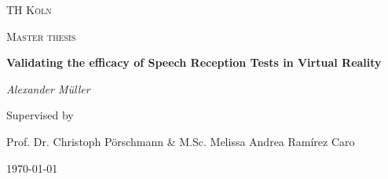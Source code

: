 \documentclass[a4paper,11pt]{article}%
\renewcommand{\\}{\vspace*{0.5\baselineskip} \newline}
\begin{document}
	

\begin{titlepage}
	\centering
	{\scshape\LARGE TH Köln \par}
	\vspace{1cm}
	{\scshape\Large Master thesis\par}
	\vspace{1.5cm}
	{\huge\bfseries Validating the efficacy of Speech Reception Tests in Virtual Reality\par}
	\vspace{2cm}
	{\Large\itshape Alexander Müller \par}
	\vfill
	Supervised by\par
    \par Prof. Dr. Christoph Pörschmann 	\&  M.Sc. Melissa Andrea Ramírez Caro \par
	\vfill

	{\large \today\par}
\end{titlepage}


\newpage
{}




\end{document}
